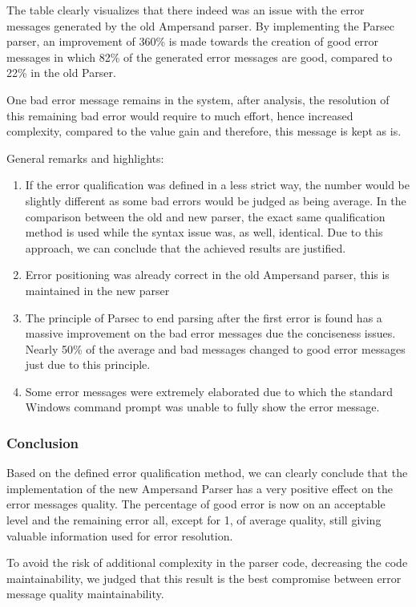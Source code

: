 The table clearly visualizes that there indeed was an issue with the error messages generated by the old Ampersand parser.
By implementing the Parsec parser, an improvement of 360\% is made towards the creation of good error messages in which 82\% of the generated error messages are good, compared to 22\% in the old Parser.

One bad error message remains in the system, after analysis, the resolution of this remaining bad error would require to much effort, hence increased complexity, compared to the value gain and therefore, this message is kept as is.

General remarks and highlights:
 \begin{enumerate}
	\item 	If the error qualification was defined in a less strict way, the number would be slightly different as some bad errors would be judged as being average. 
		In the comparison between the old and new parser, the exact same qualification method is used while the syntax issue was, as well, identical.
		Due to this approach, we can conclude that the achieved results are justified.
	\item 	Error positioning was already correct in the old Ampersand parser, this is maintained in the new parser
	\item 	The principle of Parsec to end parsing after the first error is found has a massive improvement on the bad error messages due the conciseness issues.
		Nearly 50\% of the average and bad messages changed to good error messages just due to this principle.
	\item 	Some error messages were extremely elaborated due to which the standard Windows command prompt was unable to fully show the error message.
\end {enumerate}

\subsubsection{Conclusion}
Based on the defined error qualification method, we can clearly conclude that the implementation of the new Ampersand Parser has a very positive effect on the error messages quality.
The percentage of good error is now on an acceptable level and the remaining error all, except for 1, of average quality, still giving valuable information used for error resolution.

To avoid the risk of additional complexity in the parser code, decreasing the code maintainability, we judged that this result is  the best compromise between error message quality maintainability.
